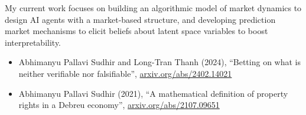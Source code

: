 \documentclass{article}
\begin{document}
My current work focuses on building an algorithmic model of market dynamics to design AI agents with a market-based structure, and developing prediction market mechanisms to elicit beliefs about latent space variables to boost interpretability.

\begin{itemize}

    \item
          Abhimanyu Pallavi Sudhir and Long-Tran Thanh (2024), ``Betting on what is neither verifiable nor falsifiable'', \href{https://arxiv.org/abs/2402.14021}{arxiv.org/abs/2402.14021}

    \item
          Abhimanyu Pallavi Sudhir (2021),
          ``A mathematical definition of property rights in a Debreu economy'',
          \href{https://arxiv.org/abs/2107.09651}{arxiv.org/abs/2107.09651}

\end{itemize}
\end{document}
